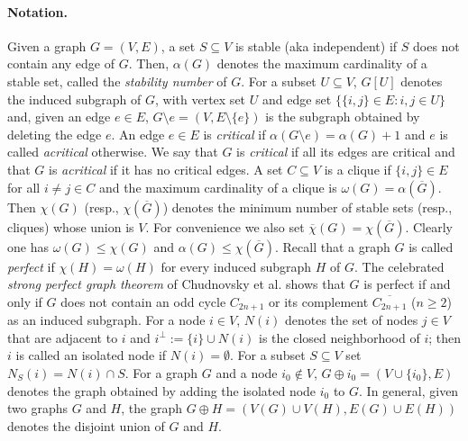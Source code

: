\documentclass[11pt]{article}
\numberwithin{equation}{section}
\newcommand{\supp}{\text{\rm Supp}}
\newcommand{\MoL}{\textcolor{red}}
\begin{document}
\paragraph*{Notation.}
Given a graph $G=(V,E)$, a set $S\subseteq V$ is  {stable} (aka {independent}) if $S$ does not contain any  edge of $G$. Then, $\alpha(G)$ denotes the maximum cardinality of a stable set, called  the {\em stability number} of $G$. For a subset $U\subseteq V$,  $G[U]$ denotes the induced subgraph of $G$, with vertex set $U$ and edge set $\{\{i,j\}\in E: i,j\in U\}$ and, given an edge $e\in E$, $G\setminus e=(V,E\setminus \{e\})$ is the subgraph obtained by deleting the edge $e$.
An edge $e\in E$ is {\em critical} if $\alpha(G\setminus e)=\alpha(G)+1$  and $e$ is called  {\em acritical} otherwise.
We say that $G$ is {\em critical} if all its edges are critical and that $G$ is {\em acritical} if it has no critical edges. A set $C\subseteq V$ is a clique if $\{i, j\}\in E$ for all $i\ne j\in C$ and the maximum cardinality of a clique is  $\omega(G)=\alpha(\overline G)$. Then $\chi(G)$ (resp., $\chi(\overline G)$) denotes the minimum number of stable sets (resp., cliques) whose  union is $V$. For convenience we also set $\overline \chi(G)=\chi(\overline G)$. Clearly one has $\omega( G)\le \chi(G)$ and $\alpha(G)\le \chi(\overline G)$. 
Recall that a graph $G$ is called {\em perfect} if $\chi(H)=\omega(H)$ for every induced subgraph $H$ of $G$. The celebrated {\em strong perfect graph theorem} of Chudnovsky et al. \cite{SPGT} shows that $G$ is perfect if and only if $G$ does not contain an odd cycle $C_{2n+1}$ or its complement $\overline{C_{2n+1}}$ ($n\ge 2$) as an induced subgraph. For a node $i\in V$,   $N(i)$ denotes the set of nodes $j\in V$ that are adjacent to $i$ and   $i^\perp:= \{i\}\cup N(i)$ is the closed neighborhood of $i$; then $i$ is called an isolated node if $N(i)=\emptyset$. For a subset $S\subseteq V$  set $N_S(i)=N(i)\cap S$. For a graph $G$ and a node $i_0\not\in V$, $G\oplus i_0=(V\cup\{i_0\},E)$ denotes the graph obtained by adding the isolated node $i_0$ to $G$. In general, given two graphs $G$ and $H$,  the graph $G\oplus H=(V(G)\cup V(H), E(G)\cup E(H))$ denotes the disjoint union of  $G$ and $H$.  
\end{document}
